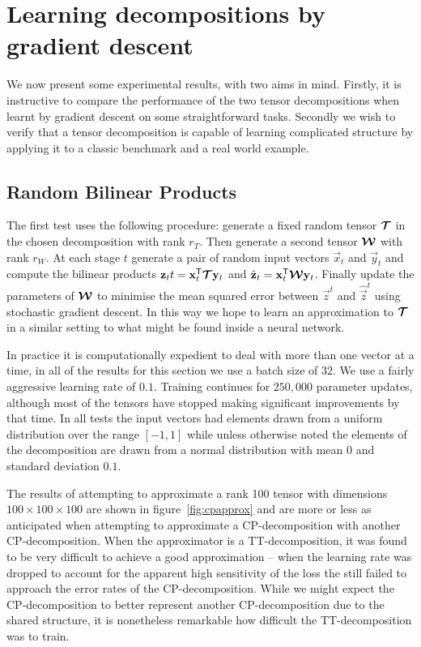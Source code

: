 {\section{Learning decompositions by gradient descent}
We now present some experimental results, with two aims in mind. Firstly, it is instructive to compare
the performance of the two tensor decompositions when learnt by gradient descent on some
straightforward tasks. Secondly we wish to verify that a tensor decomposition is capable of learning
complicated structure by applying it to a classic benchmark and a real world example.

\subsection{Random Bilinear Products}\label{sec:randbilin}
The first test uses the following procedure: generate a fixed random tensor \(\bm{\mathcal{T}}\)
in the chosen decomposition with rank \(r_T\). Then generate a second tensor \(\bm{\mathcal{W}}\) 
with rank \(r_W\). At each stage \(t\) generate a pair of random input vectors \(\vec{x}_t\) and
\(\vec{y}_t\) and compute the bilinear products 
\(\mathbf{z}_tt = \mathbf{x}_t^\mathsf{T}\bm{\mathcal{T}}\mathbf{y}_t\) and 
\(\hat{\mathbf{z}}_t = \mathbf{x}_t^\mathsf{T}\bm{\mathcal{W}}\mathbf{y}_t\). Finally update the parameters of
\(\bm{\mathcal{W}}\) to minimise the mean squared error between \(\vec{z}^t\) and \(\hat{\vec{z}}^t\)
using stochastic gradient descent. In this way we hope to learn an approximation to 
\(\bm{\mathcal{T}}\) in a similar setting to what might be found inside a neural network.

In practice it is computationally expedient to deal with more than one vector at a time, in
all of the results for this section we use a batch size of \(32\). We use a fairly aggressive
 learning rate of \(0.1\).
Training continues for \(250,000\) parameter updates, although most of the tensors have stopped
making significant improvements by that time. In all tests the input vectors had elements drawn
from a uniform distribution over the range \([-1,1]\) while unless otherwise noted the elements of
the decomposition are drawn from a normal distribution with mean \(0\) and standard deviation
\(0.1\).

The results of attempting to approximate a rank 100 tensor with dimensions 
\(100 \times 100 \times 100\) are shown in figure~\ref{fig:cpapprox} and are more or less
as anticipated when attempting to approximate a CP-decomposition with another CP-decomposition.
When the approximator is a TT-decomposition, it was found to be very difficult to achieve a
good approximation -- when the learning rate was dropped to account for the apparent high
sensitivity of the loss the still failed to approach the error rates of the CP-decomposition.
While we might expect the CP-decomposition to better represent another CP-decomposition due to
the shared structure, it is nonetheless remarkable how difficult the TT-decomposition was to
train.

}
